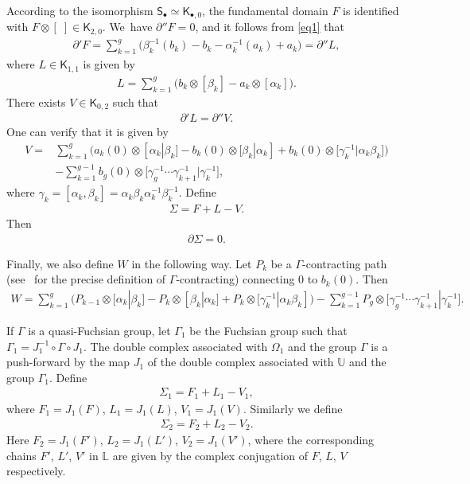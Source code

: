 \documentclass[10pt,a4paper]{amsart}
\numberwithin{equation}{section}
\newcommand{\pa}{\partial}
\begin{document}
According to the isomorphism
$\mathsf{S}_{\bullet}\simeq\mathsf{K}_{\bullet,0}$, the fundamental domain $F$ is
identified with $F \otimes [\;] \allowbreak\in \mathsf{K}_{2,0}$. We~have $\pa'' F
= 0$, and it follows from \eqref{eq1} that
\begin{gather*}
\pa' F = \sum_{k=1}^g \big(\beta_k^{-1}(b_k) - b_k -\alpha_k^{-1}(a_k) +a_k\big) =\partial'' L,
\end{gather*}
where $L\in \mathsf{K}_{1,1}$ is given by
\begin{gather*} %
L= \sum_{k=1}^g \big(b_k\otimes[\beta_k] -a_k\otimes[\alpha_k]\big).
\end{gather*}
There exists $V\in\mathsf{K}_{0,2}$ such that
\begin{gather*}%
 \pa ' L=\pa'' V.
\end{gather*}
 One can verify that it is given by
\begin{align*} %
V= {}&\sum_{k=1}^g \big(a_k(0)\otimes[ \alpha_k| \beta_k] - b_k(0)\otimes[\beta_k|\alpha_k] +
b_k(0)\otimes\big[\gamma_k^{-1}|\alpha_k\beta_k\big]\big)
\\
& -\sum_{k=1}^{g-1}
b_g(0)\otimes\big[\gamma_g^{-1}\cdots\gamma_{k+1}^{-1}|\gamma_k^{-1}\big],
\end{align*}
where $\gamma_k=[\alpha_k, \beta_k]=\alpha_k\beta_k\alpha_k^{-1}\beta_k^{-1}$.
Define
\begin{gather*}
\Sigma = F + L - V.
\end{gather*}
Then
\begin{gather*}
\pa \Sigma = 0.
\end{gather*}

Finally, we also define $W$ in the following way. Let $P_k$ be a $\Gamma$-contracting path (see~\cite[Definition~2.3]{2} for the precise definition of $\Gamma$-contracting) connecting 0 to $b_k(0)$. Then
\begin{gather*} %
W = \sum_{k=1}^g\! \big(P_{k-1}\otimes[\alpha_k|\beta_k] -
P_k\otimes[\beta_k|\alpha_k] +P_k\otimes[\gamma_k^{-1}|\alpha_k\beta_k]\big)
-\sum_{k=1}^{g-1}\!
P_g\otimes\big[\gamma_g^{-1}\cdots\gamma_{k+1}^{-1}| \gamma_k^{-1}\big].
\end{gather*}

If $\Gamma$ is a quasi-Fuchsian group, let $\Gamma_1$ be the Fuchsian group such that $\Gamma_1=J_1^{-1}\circ \Gamma\circ J_1$. The double complex associated with $\Omega_1$ and the group $\Gamma$ is a push-forward by the map $J_1$ of the double complex associated with $\mathbb{U}$ and the group $\Gamma_1$. Define
\begin{gather*}
\Sigma_1 =F_1 +L_1 -V_1,
\end{gather*}
where $F_1=J_1(F)$, $L_1=J_1(L)$, $V_1=J_1(V)$. Similarly we define
\begin{gather*}
\Sigma_2 =F_2 +L_2 -V_2.
\end{gather*}
Here $F_2=J_1(F')$, $L_2=J_1(L')$, $V_2=J_1(V')$, where the corresponding chains $F'$, $L'$, $V'$ in $\mathbb{L}$ are given by the complex conjugation of $F$, $L$, $V$ respectively.
\end{document}
